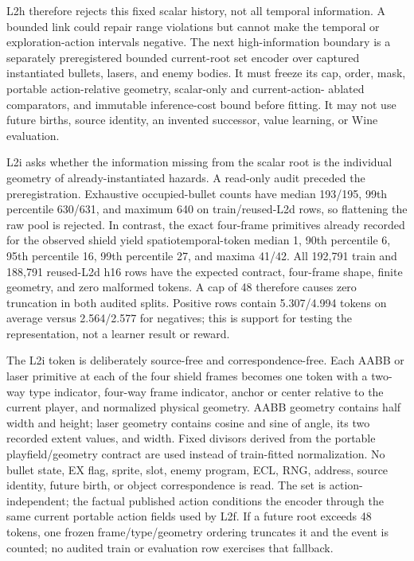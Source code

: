 \documentclass[11pt]{article}
\begin{document}
L2h therefore rejects this fixed scalar history, not all temporal information.
A bounded link could repair range violations but cannot make the temporal or
exploration-action intervals negative.  The next high-information boundary is
a separately preregistered bounded current-root set encoder over captured
instantiated bullets, lasers, and enemy bodies.  It must freeze its cap, order,
mask, portable action-relative geometry, scalar-only and current-action-
ablated comparators, and immutable inference-cost bound before fitting.  It may
not use future births, source identity, an invented successor, value learning,
or Wine evaluation.

L2i asks whether the information missing from the scalar root is the individual
geometry of already-instantiated hazards.  A read-only audit preceded the
preregistration.  Exhaustive occupied-bullet counts have median 193/195,
99th percentile 630/631, and maximum 640 on train/reused-L2d rows, so flattening
the raw pool is rejected.  In contrast, the exact four-frame primitives already
recorded for the observed shield yield spatiotemporal-token median 1, 90th
percentile 6, 95th percentile 16, 99th percentile 27, and maxima 41/42.  All
192,791 train and 188,791 reused-L2d h16 rows have the expected contract,
four-frame shape, finite geometry, and zero malformed tokens.  A cap of 48
therefore causes zero truncation in both audited splits.  Positive rows contain
5.307/4.994 tokens on average versus 2.564/2.577 for negatives; this is support
for testing the representation, not a learner result or reward.

The L2i token is deliberately source-free and correspondence-free.  Each AABB
or laser primitive at each of the four shield frames becomes one token with a
two-way type indicator, four-way frame indicator, anchor or center relative to
the current player, and normalized physical geometry.  AABB geometry contains
half width and height; laser geometry contains cosine and sine of angle, its two
recorded extent values, and width.  Fixed divisors derived from the portable
playfield/geometry contract are used instead of train-fitted normalization.
No bullet state, EX flag, sprite, slot, enemy program, ECL, RNG, address, source
identity, future birth, or object correspondence is read.  The set is
action-independent; the factual published action conditions the encoder through
the same current portable action fields used by L2f.  If a future root exceeds
48 tokens, one frozen frame/type/geometry ordering truncates it and the event is
counted; no audited train or evaluation row exercises that fallback.
\end{document}
